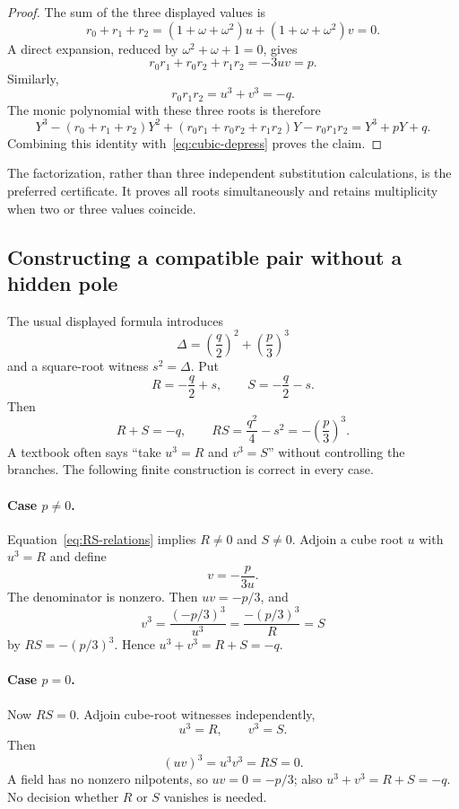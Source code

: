 \begin{proof}
The sum of the three displayed values is
\[
 r_0+r_1+r_2
 =(1+\omega+\omega^2)u+(1+\omega+\omega^2)v=0.
\]
A direct expansion, reduced by $\omega^2+\omega+1=0$, gives
\[
 r_0r_1+r_0r_2+r_1r_2=-3uv=p.
\]
Similarly,
\[
 r_0r_1r_2=u^3+v^3=-q.
\]
The monic polynomial with these three roots is therefore
\[
 Y^3-(r_0+r_1+r_2)Y^2
 +(r_0r_1+r_0r_2+r_1r_2)Y-r_0r_1r_2
 =Y^3+pY+q.
\]
Combining this identity with~\eqref{eq:cubic-depress} proves the claim.
\end{proof}

The factorization, rather than three independent substitution calculations,
is the preferred certificate.  It proves all roots simultaneously and retains
multiplicity when two or three values coincide.

\subsection{Constructing a compatible pair without a hidden pole}

The usual displayed formula introduces
\[
 \Delta=\left(\frac q2\right)^2+\left(\frac p3\right)^3
 \tag{C8}\label{eq:cardano-delta}
\]
and a square-root witness $s^2=\Delta$.  Put
\[
 R=-\frac q2+s,
 \qquad
 S=-\frac q2-s.
 \tag{C9}\label{eq:RS}
\]
Then
\[
 R+S=-q,
 \qquad
 RS=\frac{q^2}{4}-s^2=-\left(\frac p3\right)^3.
 \tag{C10}\label{eq:RS-relations}
\]
A textbook often says ``take $u^3=R$ and $v^3=S$'' without controlling the
branches.  The following finite construction is correct in every case.

\paragraph{Case $p\ne0$.}
Equation~\eqref{eq:RS-relations} implies $R\ne0$ and $S\ne0$.  Adjoin a cube
root $u$ with $u^3=R$ and define
\[
 v=-\frac{p}{3u}.
 \tag{C11}\label{eq:v-defined}
\]
The denominator is nonzero.  Then $uv=-p/3$, and
\[
 v^3=\frac{(-p/3)^3}{u^3}
 =\frac{-(p/3)^3}{R}=S
\]
by $RS=-(p/3)^3$.  Hence $u^3+v^3=R+S=-q$.

\paragraph{Case $p=0$.}
Now $RS=0$.  Adjoin cube-root witnesses independently,
\[
 u^3=R,\qquad v^3=S.
\]
Then
\[
 (uv)^3=u^3v^3=RS=0.
\]
A field has no nonzero nilpotents, so $uv=0=-p/3$; also
$u^3+v^3=R+S=-q$.  No decision whether $R$ or $S$ vanishes is needed.

